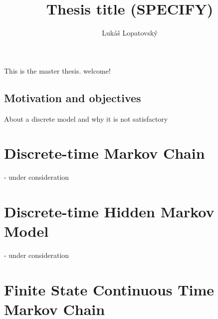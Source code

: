 \documentclass[thesis=M,english]{FITthesis}[2012/10/20]
\title{Thesis title (SPECIFY)}
\author{Luk{\' a}{\v s} Lopatovsk{\' y}} %
\begin{document}


\begin{introduction}
	This is the master thesis. welcome!
	\section{Motivation and objectives}
	About a discrete model and why it is not satisfactory  %
	
	
\end{introduction}


\chapter{Discrete-time Markov Chain}
- under consideration
\chapter{Discrete-time Hidden Markov Model}
- under consideration

\chapter{Finite State Continuous Time Markov Chain} 
\end{document}
